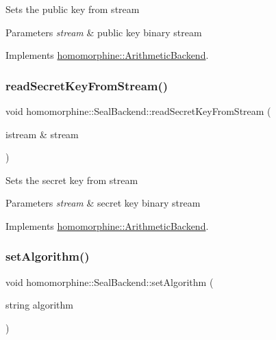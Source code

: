 Sets the public key from stream


\begin{DoxyParams}{Parameters}
{\em stream} & public key binary stream \\
\hline
\end{DoxyParams}


Implements \mbox{\hyperlink{classhomomorphine_1_1_arithmetic_backend_aab5aac202ce0911e99e8adce7ffb707a}{homomorphine\+::\+Arithmetic\+Backend}}.

\mbox{\label{classhomomorphine_1_1_seal_backend_a5c1607bb712ff2776f4d4ca0c75b3e37}} 
\subsubsection{\texorpdfstring{readSecretKeyFromStream()}{readSecretKeyFromStream()}}
{\footnotesize\ttfamily void homomorphine\+::\+Seal\+Backend\+::read\+Secret\+Key\+From\+Stream (\begin{DoxyParamCaption}\item[{istream \&}]{stream }\end{DoxyParamCaption})\hspace{0.3cm}{\ttfamily [virtual]}}

Sets the secret key from stream


\begin{DoxyParams}{Parameters}
{\em stream} & secret key binary stream \\
\hline
\end{DoxyParams}


Implements \mbox{\hyperlink{classhomomorphine_1_1_arithmetic_backend_a69b65cd979de00a9afa0c38c3b4329b0}{homomorphine\+::\+Arithmetic\+Backend}}.

\mbox{\label{classhomomorphine_1_1_seal_backend_a46a336bca80c5450a1f3ea1125d0d0e8}} 
\subsubsection{\texorpdfstring{setAlgorithm()}{setAlgorithm()}\hspace{0.1cm}{\footnotesize\ttfamily [1/2]}}
{\footnotesize\ttfamily void homomorphine\+::\+Seal\+Backend\+::set\+Algorithm (\begin{DoxyParamCaption}\item[{string}]{algorithm }\end{DoxyParamCaption})\hspace{0.3cm}{\ttfamily [virtual]}}


